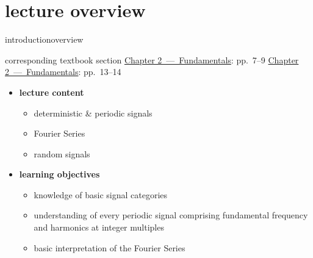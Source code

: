 




\subtitle{Module 2.0: Fundamentals~---~Signals}


	

    \section[overview]{lecture overview}
        \begin{frame}{introduction}{overview}
            \begin{block}{corresponding textbook section}
                    \href{http://ieeexplore.ieee.org/xpl/articleDetails.jsp?tp=&arnumber=6331119&}{Chapter 2~---~Fundamentals}: pp.~7--9
                    \href{http://ieeexplore.ieee.org/xpl/articleDetails.jsp?tp=&arnumber=6331119&}{Chapter 2~---~Fundamentals}: pp.~13--14
            \end{block}

            \begin{itemize}
                \item   \textbf{lecture content}
                    \begin{itemize}
                        \item   deterministic \& periodic signals
                        \item   Fourier Series
                        \item   random signals
                    \end{itemize}
                \bigskip
                \item<2->   \textbf{learning objectives}
                    \begin{itemize}
                        \item   knowledge of basic signal categories
                        \item   understanding of every periodic signal comprising fundamental frequency and harmonics at integer multiples
                        \item   basic interpretation of the Fourier Series
                    \end{itemize}
            \end{itemize}
        \end{frame}
        
